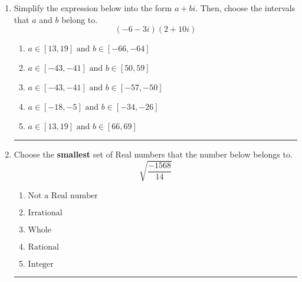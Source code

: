 \documentclass[14pt]{extbook}
\newcommand{\litem}[1]{\item#1\hspace*{-1cm}\rule{\textwidth}{0.4pt}}
\begin{document}
\begin{enumerate}
{\begin{enumerate}[label=\Alph*.]
\end{enumerate} }
\litem{
Simplify the expression below into the form $a+bi$. Then, choose the intervals that $a$ and $b$ belong to.\[ (-6 - 3 i)(2 + 10 i) \]\begin{enumerate}[label=\Alph*.]
\item \( a \in [13, 19] \text{ and } b \in [-66, -64] \)
\item \( a \in [-43, -41] \text{ and } b \in [50, 59] \)
\item \( a \in [-43, -41] \text{ and } b \in [-57, -50] \)
\item \( a \in [-18, -5] \text{ and } b \in [-34, -26] \)
\item \( a \in [13, 19] \text{ and } b \in [66, 69] \)

\end{enumerate} }
\litem{
Choose the \textbf{smallest} set of Real numbers that the number below belongs to.\[ \sqrt{\frac{-1568}{14}} \]\begin{enumerate}[label=\Alph*.]
\item \( \text{Not a Real number} \)
\item \( \text{Irrational} \)
\item \( \text{Whole} \)
\item \( \text{Rational} \)
\item \( \text{Integer} \)

\end{enumerate} }
\end{enumerate}
\end{document}
